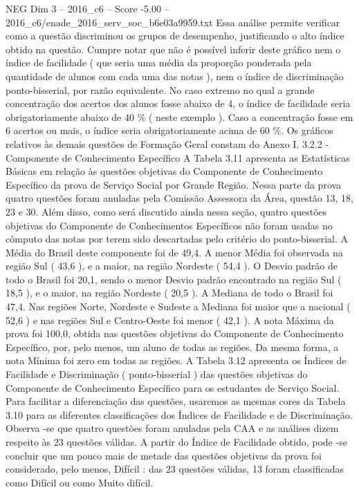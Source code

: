 \begin{textsample}{NEG Dim 3 – 2016\_c6 – Score -5.00 – 2016\_c6/enade\_2016\_serv\_soc\_b6e03a9959.txt}
Essa análise permite verificar como a questão discriminou os grupos de desempenho, justificando o alto índice obtido na questão.
Cumpre notar que não é possível inferir deste gráfico nem o índice de facilidade ( que seria uma média da proporção ponderada pela quantidade de alunos com cada uma das notas ), nem o índice de discriminação ponto-bisserial, por razão equivalente.
No caso extremo no qual a grande concentração dos acertos dos alunos fosse abaixo de 4, o índice de facilidade seria obrigatoriamente abaixo de 40 \% ( neste exemplo ).
Caso a concentração fosse em 6 acertos ou mais, o índice seria obrigatoriamente acima de 60 \%.
Os gráficos relativos às demais questões de Formação Geral constam do Anexo I. 3.2.2 - Componente de Conhecimento Específico A Tabela 3.11 apresenta as Estatísticas Básicas em relação às questões objetivas do Componente de Conhecimento Específico da prova de Serviço Social por Grande Região.
Nessa parte da prova quatro questões foram anuladas pela Comissão Assessora da Área, questão 13, 18, 23 e 30.
Além disso, como será discutido ainda nessa seção, quatro questões objetivas do Componente de Conhecimentos Específicos não foram usadas no cômputo das notas por terem sido descartadas pelo critério do ponto-bisserial.
A Média do Brasil deste componente foi de 49,4.
A menor Média foi observada na região Sul ( 43,6 ), e a maior, na região Nordeste ( 54,4 ).
O Desvio padrão de todo o Brasil foi 20,1, sendo o menor Desvio padrão encontrado na região Sul ( 18,5 ), e o maior, na região Nordeste ( 20,5 ).
A Mediana de todo o Brasil foi 47,4.
Nas regiões Norte, Nordeste e Sudeste a Mediana foi maior que a nacional ( 52,6 ) e nas regiões Sul e Centro-Oeste foi menor ( 42,1 ).
A nota Máxima da prova foi 100,0, obtida nas questões objetivas do Componente de Conhecimento Específico, por, pelo menos, um aluno de todas as regiões.
Da mesma forma, a nota Mínima foi zero em todas as regiões.
A Tabela 3.12 apresenta os Índices de Facilidade e Discriminação ( ponto-bisserial ) das questões objetivas do Componente de Conhecimento Específico para os estudantes de Serviço Social.
Para facilitar a diferenciação das questões, usaremos as mesmas cores da Tabela 3.10 para as diferentes classificações dos Índices de Facilidade e de Discriminação.
Observa -se que quatro questões foram anuladas pela CAA e as análises dizem respeito às 23 questões válidas.
A partir do Índice de Facilidade obtido, pode -se concluir que um pouco mais de metade das questões objetivas da prova foi considerado, pelo menos, Difícil : das 23 questões válidas, 13 foram classificadas como Difícil ou como Muito difícil.

\end{textsample}
